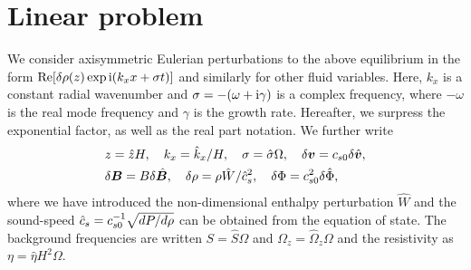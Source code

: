 \section{Linear problem}\label{linear}
We consider axisymmetric Eulerian perturbations to the above
equilibrium in the form $\operatorname{Re}[\delta\rho(z)\exp{\mathrm{i}(k_xx + \sigma
    t)}]$ and similarly for other fluid variables. Here, $k_x$ is a constant radial wavenumber and 
$\sigma=-(\omega +\mathrm{i}\gamma)$ is a complex 
frequency, where $-\omega$ is the real mode frequency and $\gamma$ is
the growth rate. Hereafter, we surpress the exponential factor, as
well as the real part notation.  We further write 
\begin{align}
  &z=\hat{z}H,\quad k_x =  \hat{k}_x/H,\quad \sigma = \hat{\sigma}\Omega,
  \quad \delta\bm{v} = c_{s0} 
  \delta\hat{\bm{v}}, \\ 
  &\delta\bm{B} = B\delta\hat{\bm{B}},\quad
  \delta\rho = \rho\hat{W}/\hat{c}_s^2,\quad \delta\Phi =
  c_{s0}^2\delta\hat{\Phi}, 
\end{align}
where we have introduced the non-dimensional enthalpy perturbation
$\hat{W}$ and the sound-speed $\hat{c}_s=c_{s0}^{-1}\sqrt{dP/d\rho}$ can be 
obtained from the equation of state. The background frequencies are
written $S=\hat{S}\Omega$ and $\Omega_z=\hat{\Omega}_z\Omega$ and the 
resistivity as $\eta = \hat{\eta}H^2\Omega$. 

